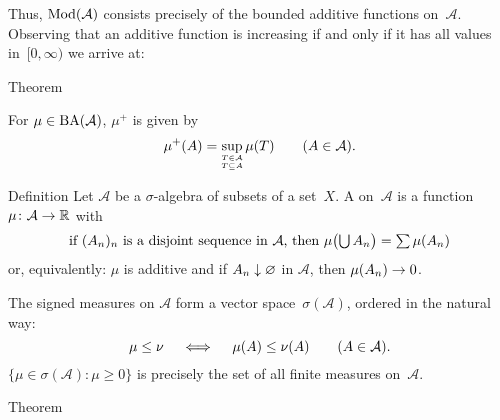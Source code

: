 \documentclass[main.tex]{subfiles}
\begin{document}
Thus, $\mathrm{Mod}(\mathcal A)$ consists precisely of
the bounded additive functions on~$\mathcal A$.
Observing that an additive function is increasing
if and only if it has all values in~$[0,\infty)$
we arrive at:
\begin{psec}{Theorem}
\label{1.12}
\end{psec}
For $\mu \in \mathrm{BA}(\mathcal A)$, $\mu^+$ is given by
\begin{equation*}
\mu^+(A) 
  = \sup_{\substack{\scriptscriptstyle T\in \mathcal{A} \\
		    \scriptscriptstyle T\subseteq A}} \mu(T)
  \qquad (A\in\mathcal A)
\text{.}
\end{equation*}
%
%
\begin{psec}{Definition}
\label{1.13}
Let $\mathcal A$ be a $\sigma$-algebra 
of subsets of a set~$X$.
A  on~$\mathcal A$
is a function~$\mu\colon\mathcal A \rightarrow \mathbb{R}$ with
\begin{equation*}
\textstyle{\ensuremath{\text{if }}(A_n)_n\ensuremath{\text{ is a disjoint sequence in }}\mathcal{A}
\ensuremath{\text{, then }}\mu\bigl(\bigcup A_n\bigr)=\sum\mu(A_n)}
\end{equation*}
or, equivalently: 
$\mu$ is additive
and if $A_n\downarrow \varnothing$ in $\mathcal A$,
then $\mu(A_n)\rightarrow 0$.

The signed measures on $\mathcal A$ form 
a vector space~$\sigma(\mathcal A)$,
ordered in the natural way:
\begin{equation*}
\mu \leq \nu 
  \quad \iff \quad
  \mu(A)\leq\nu(A)\qquad (A\in\mathcal A)
\text{.}
\end{equation*}
$\{ \mu\in \sigma(\mathcal A)\colon \mu \ge 0\}$
is precisely the set of all finite measures on~$\mathcal A$.
\end{psec}
%
%
\begin{psec}{Theorem}
\end{psec}
\end{document}
